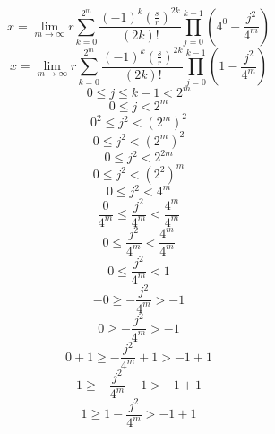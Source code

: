 \documentclass[a4paper,12pt]{report}
\begin{document}
\begin{equation}
x = \lim \limits_{m \to \infty} r \sum \limits_{k=0}^{2^m} \frac{(-1)^k \left(\frac{s}{r}\right)^{2k}}{(2k)!} \prod \limits_{j=0}^{k-1} \left(4^{0} - \frac{j^2}{4^m}\right)
\end{equation}
\begin{equation}
x = \lim \limits_{m \to \infty} r \sum \limits_{k=0}^{2^m} \frac{(-1)^k \left(\frac{s}{r}\right)^{2k}}{(2k)!} \prod \limits_{j=0}^{k-1} \left(1 - \frac{j^2}{4^m}\right)
\end{equation}
\begin{equation}
0 \leq j \leq k - 1 < 2^m
\end{equation}
\begin{equation}
0 \leq j < 2^m
\end{equation}
\begin{equation}
0^2 \leq j^2 < (2^m)^2
\end{equation}
\begin{equation}
0 \leq j^2 < (2^m)^2
\end{equation}
\begin{equation}
0 \leq j^2 < 2^{2m}
\end{equation}
\begin{equation}
0 \leq j^2 < (2^2)^m
\end{equation}
\begin{equation}
0 \leq j^2 < 4^m
\end{equation}
\begin{equation}
\frac{0}{4^m} \leq \frac{j^2}{4^m} < \frac{4^m}{4^m}
\end{equation}
\begin{equation}
0 \leq \frac{j^2}{4^m} < \frac{4^m}{4^m}
\end{equation}
\begin{equation}
0 \leq \frac{j^2}{4^m} < 1
\end{equation}
\begin{equation}
-0 \geq -\frac{j^2}{4^m} > -1
\end{equation}
\begin{equation}
0 \geq -\frac{j^2}{4^m} > -1
\end{equation}
\begin{equation}
0 + 1 \geq -\frac{j^2}{4^m} + 1 > -1 + 1
\end{equation}
\begin{equation}
1 \geq -\frac{j^2}{4^m} + 1 > -1 + 1
\end{equation}
\begin{equation}
1 \geq 1 - \frac{j^2}{4^m} > -1 + 1
\end{equation}
\end{document}
